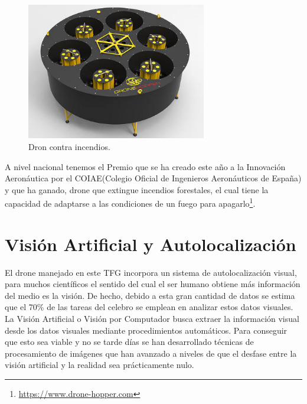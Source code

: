 \begin{figure}[H]
	\begin{center}
		\includegraphics[width=0.7\textwidth]{imag/IMG7.jpeg}
				\caption{Dron contra incendios.} 
	\label{fig:Dron Hopper.}	
	\end{center}
\end{figure}

\hspace{1cm} A nivel nacional tenemos el Premio que se ha creado este año a la Innovación Aeronáutica por el COIAE(Colegio Oficial de Ingenieros Aeronáuticos de España) y que ha ganado, drone que extingue incendios forestales, el cual tiene la capacidad de adaptarse a las condiciones de un fuego para apagarlo\footnote{\url{https://www.drone-hopper.com}}.


\section{Visión Artificial y Autolocalización}
\hspace{1cm}  El drone manejado en este TFG incorpora un sistema de autolocalización visual, para muchos científicos el sentido del cual el ser humano obtiene más información del medio es la visión. De hecho, debido a esta gran cantidad de datos se estima que el 70\% de las tareas del celebro se emplean en analizar estos datos visuales. La Visión Artificial o Visión por Computador busca extraer la información visual desde los datos visuales mediante procedimientos automáticos. Para conseguir que esto sea viable y no se tarde días se han desarrollado técnicas de procesamiento de imágenes que han avanzado a niveles de que el desfase entre la visión artificial y la realidad sea prácticamente nulo.

